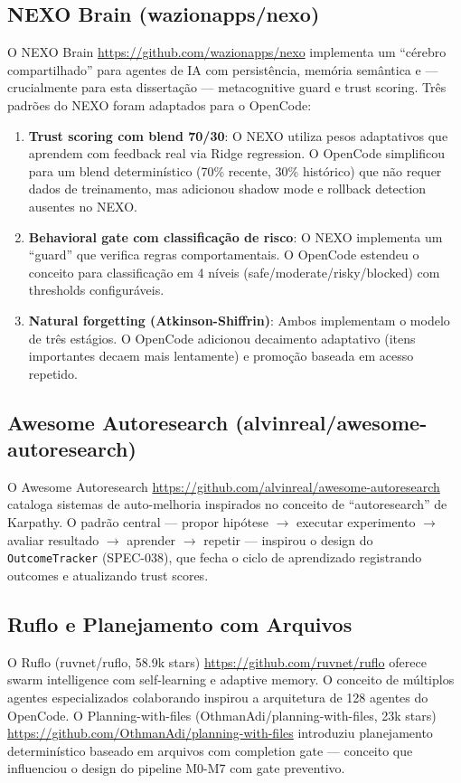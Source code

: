 \subsection{NEXO Brain (wazionapps/nexo)}

O NEXO Brain \url{https://github.com/wazionapps/nexo} implementa um ``cérebro compartilhado'' para agentes de IA com persistência, memória semântica e — crucialmente para esta dissertação — metacognitive guard e trust scoring. Três padrões do NEXO foram adaptados para o OpenCode:

\begin{enumerate}
    \item \textbf{Trust scoring com blend 70/30}: O NEXO utiliza pesos adaptativos que aprendem com feedback real via Ridge regression. O OpenCode simplificou para um blend determinístico (70\% recente, 30\% histórico) que não requer dados de treinamento, mas adicionou shadow mode e rollback detection ausentes no NEXO.
    \item \textbf{Behavioral gate com classificação de risco}: O NEXO implementa um ``guard'' que verifica regras comportamentais. O OpenCode estendeu o conceito para classificação em 4 níveis (safe/moderate/risky/blocked) com thresholds configuráveis.
    \item \textbf{Natural forgetting (Atkinson-Shiffrin)}: Ambos implementam o modelo de três estágios. O OpenCode adicionou decaimento adaptativo (itens importantes decaem mais lentamente) e promoção baseada em acesso repetido.
\end{enumerate}

\subsection{Awesome Autoresearch (alvinreal/awesome-autoresearch)}

O Awesome Autoresearch \url{https://github.com/alvinreal/awesome-autoresearch} cataloga sistemas de auto-melhoria inspirados no conceito de ``autoresearch'' de Karpathy. O padrão central — propor hipótese $\rightarrow$ executar experimento $\rightarrow$ avaliar resultado $\rightarrow$ aprender $\rightarrow$ repetir — inspirou o design do \texttt{OutcomeTracker} (SPEC-038), que fecha o ciclo de aprendizado registrando outcomes e atualizando trust scores.

\subsection{Ruflo e Planejamento com Arquivos}

O Ruflo (ruvnet/ruflo, 58.9k stars) \url{https://github.com/ruvnet/ruflo} oferece swarm intelligence com self-learning e adaptive memory. O conceito de múltiplos agentes especializados colaborando inspirou a arquitetura de 128 agentes do OpenCode. O Planning-with-files (OthmanAdi/planning-with-files, 23k stars) \url{https://github.com/OthmanAdi/planning-with-files} introduziu planejamento determinístico baseado em arquivos com completion gate — conceito que influenciou o design do pipeline M0-M7 com gate preventivo.
